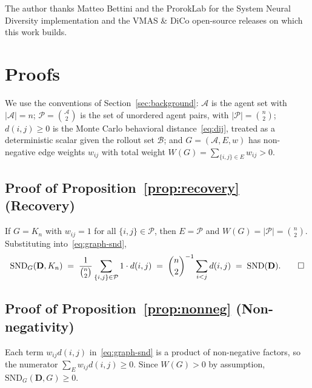 \documentclass{article}
\theoremstyle{plain}
\theoremstyle{definition}
\theoremstyle{remark}
\newcommand{\Agents}{\mathcal{A}}        %
\newcommand{\Rollouts}{\mathcal{B}}      %
\newcommand{\Pairs}{\mathcal{P}}         %
\newcommand{\SND}{\ensuremath{\mathrm{SND}}}
\newcommand{\SNDG}{\mathrm{SND}_{G}}
\begin{document}
\begin{ack}
The author thanks Matteo Bettini and the ProrokLab for the System
Neural Diversity implementation and the VMAS \& DiCo open-source
releases on which this work builds.
\end{ack}

\appendix
\section{Proofs}
\label{app:proofs}

We use the conventions of Section~\ref{sec:background}: $\Agents$ is the
agent set with $|\Agents| = n$; $\Pairs = \binom{\Agents}{2}$ is the set
of unordered agent pairs, with $|\Pairs| = \binom{n}{2}$; $d(i,j) \geq 0$
is the Monte Carlo behavioral distance~\eqref{eq:dij}, treated as a
deterministic scalar given the rollout set $\Rollouts$; and $G = (\Agents,
E, w)$ has non-negative edge weights $w_{ij}$ with total weight
$W(G) = \sum_{\{i,j\} \in E} w_{ij} > 0$.

\subsection*{Proof of Proposition~\ref{prop:recovery} (Recovery)}

If $G = K_n$ with $w_{ij} = 1$ for all $\{i,j\} \in \Pairs$, then
$E = \Pairs$ and $W(G) = |\Pairs| = \binom{n}{2}$. Substituting
into~\eqref{eq:graph-snd},
\[
\SNDG(\mathbf{D}, K_n)
\;=\; \frac{1}{\binom{n}{2}} \sum_{\{i,j\} \in \Pairs} 1 \cdot d(i,j)
\;=\; \binom{n}{2}^{-1} \sum_{i < j} d(i,j)
\;=\; \SND(\mathbf{D}). \qed
\]

\subsection*{Proof of Proposition~\ref{prop:nonneg} (Non-negativity)}

Each term $w_{ij} d(i,j)$ in~\eqref{eq:graph-snd} is a product of
non-negative factors, so the numerator $\sum_{E} w_{ij} d(i,j) \geq 0$.
Since $W(G) > 0$ by assumption, $\SNDG(\mathbf{D}, G) \geq 0$.
\end{document}
